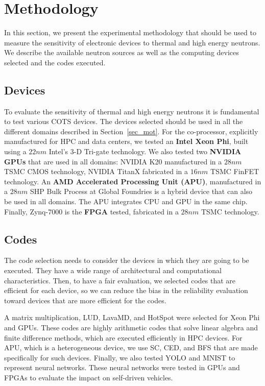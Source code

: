 \section{Methodology}
\label{sec_methodology}

In this section, we present the experimental methodology that should be used to measure the sensitivity of electronic devices to thermal and high energy neutrons. We describe the available neutron sources as well as the computing devices selected and the codes executed.

\subsection{Devices}
\label{subsec_devices}

To evaluate the sensitivity of thermal and high energy neutrons it is fundamental to test various COTS devices. The devices selected should be used in all the different domains described in Section~\ref{sec_mot}. For the co-processor, explicitly manufactured for HPC and data centers, we tested an \textbf{Intel Xeon Phi}, built using a $22nm$ Intel's 3-D Tri-gate technology. We also tested two \textbf{NVIDIA GPUs} that are used in all domains: NVIDIA K20 manufactured in a $28nm$ TSMC CMOS technology, NVIDIA TitanX fabricated in a $16nm$ TSMC FinFET technology. An \textbf{AMD Accelerated Processing Unit (APU)}, manufactured in a $28nm$ SHP Bulk Process at Global Foundries is a hybrid device that can also be used in all domains. The APU integrates CPU and GPU in the same chip. Finally, Zynq-7000 is the \textbf{FPGA} tested, fabricated in a $28nm$ TSMC technology.

\subsection{Codes}
\label{subsec_codes}

The code selection needs to consider the devices in which they are going to be executed. They have a wide range of architectural and computational characteristics. Then, to have a fair evaluation, we selected codes that are efficient for each device, so we can reduce the bias in the reliability evaluation toward devices that are more efficient for the codes.

A matrix multiplication, LUD, LavaMD, and HotSpot were selected for Xeon Phi and GPUs. These codes are highly arithmetic codes that solve linear algebra and finite difference methods, which are executed efficiently in HPC devices. For APU, which is a heterogeneous device, we use SC, CED, and BFS that are made specifically for such devices. Finally, we also tested YOLO and MNIST to represent neural networks. These neural networks were tested in GPUs and FPGAs to evaluate the impact on self-driven vehicles.

